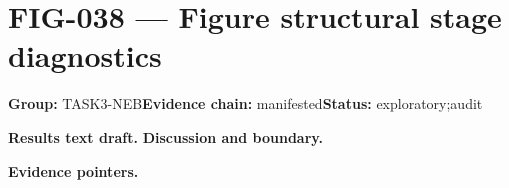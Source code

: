 \clearpage
\section{FIG-038 --- Figure structural stage diagnostics}
\label{figpage:fig-038}
\textbf{Group:} TASK3-NEB\quad \textbf{Evidence chain:} manifested\quad \textbf{Status:} exploratory;audit

\textbf{Results text draft.} 
\textbf{Discussion and boundary.} 


\textbf{Evidence pointers.}



\vfill
